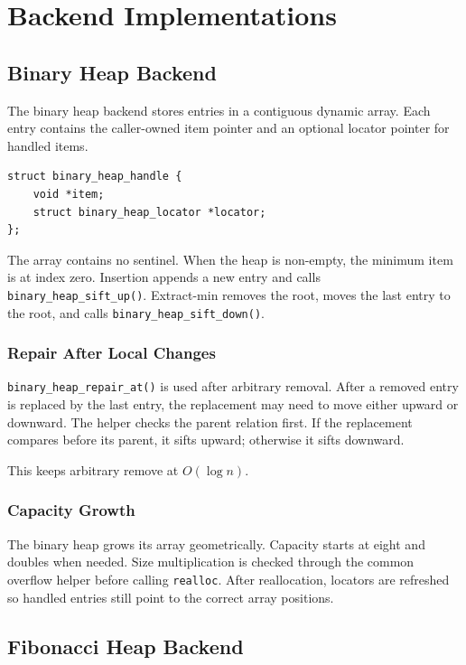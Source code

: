 \chapter{Backend Implementations}

\section{Binary Heap Backend}

The binary heap backend stores entries in a contiguous dynamic array.
Each entry contains the caller-owned item pointer and an optional locator pointer for handled items.

\begin{lstlisting}[style=cstyle, caption={Binary heap entry model.}]
struct binary_heap_handle {
    void *item;
    struct binary_heap_locator *locator;
};
\end{lstlisting}

The array contains no sentinel.
When the heap is non-empty, the minimum item is at index zero.
Insertion appends a new entry and calls \texttt{binary\_heap\_sift\_up()}.
Extract-min removes the root, moves the last entry to the root, and calls \texttt{binary\_heap\_sift\_down()}.

\subsection{Repair After Local Changes}

\texttt{binary\_heap\_repair\_at()} is used after arbitrary removal.
After a removed entry is replaced by the last entry, the replacement may need to move either upward or downward.
The helper checks the parent relation first.
If the replacement compares before its parent, it sifts upward; otherwise it sifts downward.

This keeps arbitrary remove at $O(\log n)$.

\subsection{Capacity Growth}

The binary heap grows its array geometrically.
Capacity starts at eight and doubles when needed.
Size multiplication is checked through the common overflow helper before calling \texttt{realloc}.
After reallocation, locators are refreshed so handled entries still point to the correct array positions.

\section{Fibonacci Heap Backend}

